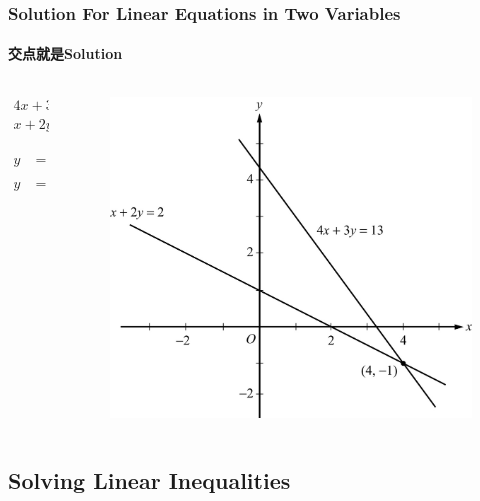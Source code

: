 \documentclass[
	11pt, %
]{beamer}
\begin{document}
	\begin{frame}
	\frametitle{Solution For Linear Equations in Two Variables}
	\framesubtitle{交点就是Solution}
	\begin{columns}[t] 
		\begin{column}{0.3\textwidth} %
		\begin{equation*}
			\begin{aligned}
				4x + 3y &= 13 \\
				x + 2y &= 2
			\end{aligned}
		\end{equation*}

		\bigskip
		\begin{equation*}
			\begin{aligned}
				y &= -\frac{3}{4} + \frac{13}{4} \\
				y &= -\frac{1}{2}x + 1
			\end{aligned}
		\end{equation*}

		\end{column}
		\begin{column}{0.7\textwidth} %
			\begin{figure}
				\includegraphics[width=0.8\linewidth]{Graphing_Linear_Equations.jpg} 
			\end{figure}
    \end{column}
	\end{columns}	
\end{frame}

\subsection{Solving Linear Inequalities}
\end{document}
